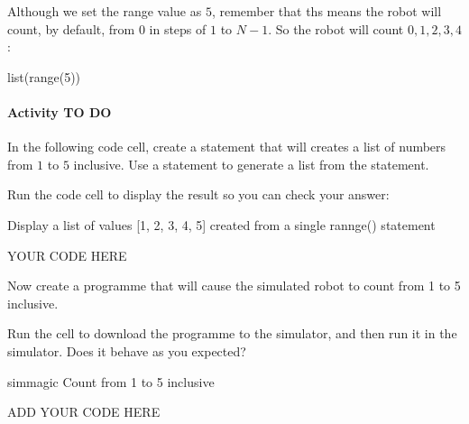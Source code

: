 \documentclass[letterpaper,10pt,english]{sphinxmanual}
\begin{document}
Although we set the range value as \(5\), remember that ths means the robot will count, by default, from \(0\) in steps of \(1\) to \(N-1\). So the robot will count \(0, 1, 2, 3, 4\):

{
\begin{sphinxVerbatim}[commandchars=\\\{\}]
\llap{\color{nbsphinxin}[ ]:\,\hspace{\fboxrule}\hspace{\fboxsep}}list(range(5))
\end{sphinxVerbatim}
}


\paragraph{Activity TO DO}
\label{\detokenize{content/00_SOFTWARE_GUIDE/Section_00_03_quick_practical_tour:Activity-TO-DO}}
In the following code cell, create a  statement that will creates a list of numbers from \(1\) to \(5\) inclusive. Use a  statement to generate a list from the  statement.

Run the code cell to display the result so you can check your answer:

{
\begin{sphinxVerbatim}[commandchars=\\\{\}]
\llap{\color{nbsphinxin}[ ]:\,\hspace{\fboxrule}\hspace{\fboxsep}}\PYGZsh{} Display a list of values [1, 2, 3, 4, 5] created from a single rannge() statement

\PYGZsh{} YOUR CODE HERE
\end{sphinxVerbatim}
}

Now create a programme that will cause the simulated robot to count from 1 to 5 inclusive.

Run the cell to download the programme to the simulator, and then run it in the simulator. Does it behave as you expected?

{
\begin{sphinxVerbatim}[commandchars=\\\{\}]
\llap{\color{nbsphinxin}[ ]:\,\hspace{\fboxrule}\hspace{\fboxsep}}\PYGZpc{}\PYGZpc{}sim\PYGZus{}magic
\PYGZsh{} Count from 1 to 5 inclusive

\PYGZsh{} ADD YOUR CODE HERE
\end{sphinxVerbatim}
}
\end{document}
